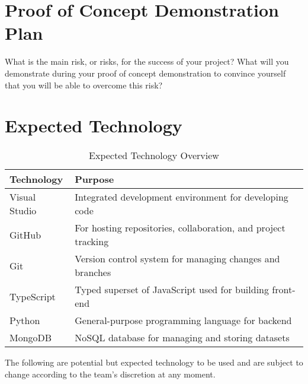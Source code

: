 \documentclass{article}
\begin{document}
\section{Proof of Concept Demonstration Plan}

What is the main risk, or risks, for the success of your project?  What will you
demonstrate during your proof of concept demonstration to convince yourself that
you will be able to overcome this risk?

\newpage{}
\section{Expected Technology}

\begin{table}[htbp]
    \centering
    \begin{tabularx}{\textwidth}{|l|>{\raggedright\arraybackslash}X|}  
    \hline
    Technology & Purpose \\
    \hline
    Visual Studio & Integrated development environment for developing code \\
    \hline
    GitHub & For hosting repositories, collaboration, and project tracking \\
    \hline
    Git & Version control system for managing changes and branches \\
    \hline
    TypeScript & Typed superset of JavaScript used for building front-end \\
    \hline
    Python & General-purpose programming language for backend \\
    \hline
    MongoDB & NoSQL database for managing and storing datasets \\
    \hline
    \end{tabularx}
    \caption{Expected Technology Overview}
\end{table}

The following are potential but expected technology to be used and are subject to change according to the team’s discretion at any moment.
\end{document}
